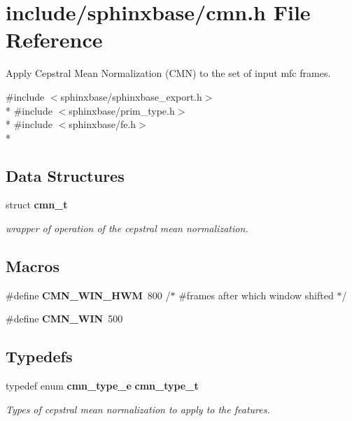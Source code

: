 \section{include/sphinxbase/cmn.h File Reference}
\label{cmn_8h}


Apply Cepstral Mean Normalization (C\+M\+N) to the set of input mfc frames.  


{\ttfamily \#include $<$sphinxbase/sphinxbase\+\_\+export.\+h$>$}\\*
{\ttfamily \#include $<$sphinxbase/prim\+\_\+type.\+h$>$}\\*
{\ttfamily \#include $<$sphinxbase/fe.\+h$>$}\\*
\subsection*{Data Structures}
\begin{DoxyCompactItemize}
\item 
struct {\bf cmn\+\_\+t}
\begin{DoxyCompactList}\small\item\em wrapper of operation of the cepstral mean normalization. \end{DoxyCompactList}\end{DoxyCompactItemize}
\subsection*{Macros}
\begin{DoxyCompactItemize}
\item 
\#define {\bfseries C\+M\+N\+\_\+\+W\+I\+N\+\_\+\+H\+W\+M}~800     /$\ast$ \#frames after which window shifted $\ast$/\label{cmn_8h_abbf37b74032c295136b4b299ecfcedae}

\item 
\#define {\bfseries C\+M\+N\+\_\+\+W\+I\+N}~500\label{cmn_8h_a500dafed8351d334da9290ec4f3f6ab3}

\end{DoxyCompactItemize}
\subsection*{Typedefs}
\begin{DoxyCompactItemize}
\item 
typedef enum {\bf cmn\+\_\+type\+\_\+e} {\bf cmn\+\_\+type\+\_\+t}\label{cmn_8h_a9384c411b10e9db9745cfb550a5c7652}

\begin{DoxyCompactList}\small\item\em Types of cepstral mean normalization to apply to the features. \end{DoxyCompactList}\end{DoxyCompactItemize}
